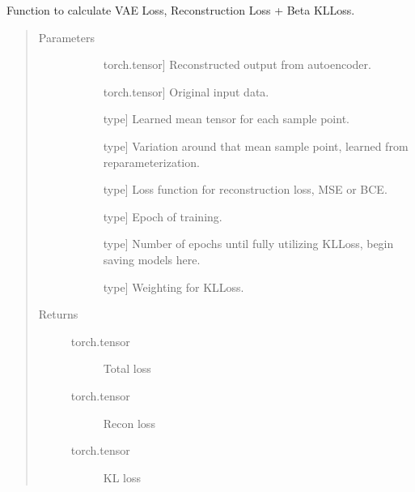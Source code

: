 \documentclass[letterpaper,10pt,english]{sphinxmanual}
\begin{document}
\begin{fulllineitems}
\label{\detokenize{index:methylnet.models.vae_loss}}
Function to calculate VAE Loss, Reconstruction Loss + Beta KLLoss.
\begin{quote}\begin{description}
\item[{Parameters}] \leavevmode\begin{description}
\item[{}] \leavevmode{[}torch.tensor{]}
Reconstructed output from autoencoder.

\item[{}] \leavevmode{[}torch.tensor{]}
Original input data.

\item[{}] \leavevmode{[}type{]}
Learned mean tensor for each sample point.

\item[{}] \leavevmode{[}type{]}
Variation around that mean sample point, learned from reparameterization.

\item[{}] \leavevmode{[}type{]}
Loss function for reconstruction loss, MSE or BCE.

\item[{}] \leavevmode{[}type{]}
Epoch of training.

\item[{}] \leavevmode{[}type{]}
Number of epochs until fully utilizing KLLoss, begin saving models here.

\item[{}] \leavevmode{[}type{]}
Weighting for KLLoss.

\end{description}

\item[{Returns}] \leavevmode\begin{description}
\item[{torch.tensor}] \leavevmode
Total loss

\item[{torch.tensor}] \leavevmode
Recon loss

\item[{torch.tensor}] \leavevmode
KL loss

\end{description}

\end{description}\end{quote}

\end{fulllineitems}
\end{document}
